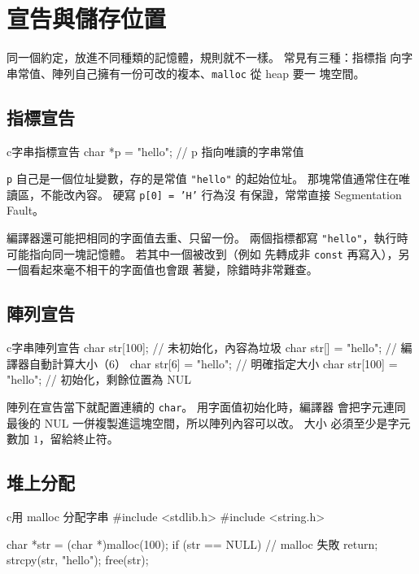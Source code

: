 \section{宣告與儲存位置}
\label{sec:str-declare-storage}

同一個約定，放進不同種類的記憶體，規則就不一樣。 常見有三種：指標指
向字串常值、陣列自己擁有一份可改的複本、\texttt{malloc} 從 heap 要一
塊空間。

\subsection{指標宣告}

\begin{code}{c}{字串指標宣告}
char *p = "hello";    // p 指向唯讀的字串常值
\end{code}

\texttt{p} 自己是一個位址變數，存的是常值 \texttt{"hello"} 的起始位址。
那塊常值通常住在唯讀區，不能改內容。 硬寫 \texttt{p[0] = 'H'} 行為沒
有保證，常常直接 Segmentation Fault。

編譯器還可能把相同的字面值去重、只留一份。 兩個指標都寫
\texttt{"hello"}，執行時可能指向同一塊記憶體。 若其中一個被改到（例如
先轉成非 \texttt{const} 再寫入），另一個看起來毫不相干的字面值也會跟
著變，除錯時非常難查。

\subsection{陣列宣告}

\begin{code}{c}{字串陣列宣告}
char str[100];              // 未初始化，內容為垃圾
char str[] = "hello";       // 編譯器自動計算大小（6）
char str[6] = "hello";      // 明確指定大小
char str[100] = "hello";    // 初始化，剩餘位置為 NUL
\end{code}

陣列在宣告當下就配置連續的 \texttt{char}。 用字面值初始化時，編譯器
會把字元連同最後的 NUL 一併複製進這塊空間，所以陣列內容可以改。 大小
必須至少是字元數加 $1$，留給終止符。

\subsection{堆上分配}

\begin{code}{c}{用 malloc 分配字串}
#include <stdlib.h>
#include <string.h>

char *str = (char *)malloc(100);
if (str == NULL) {
    // malloc 失敗
    return;
}
strcpy(str, "hello");
free(str);
\end{code}

